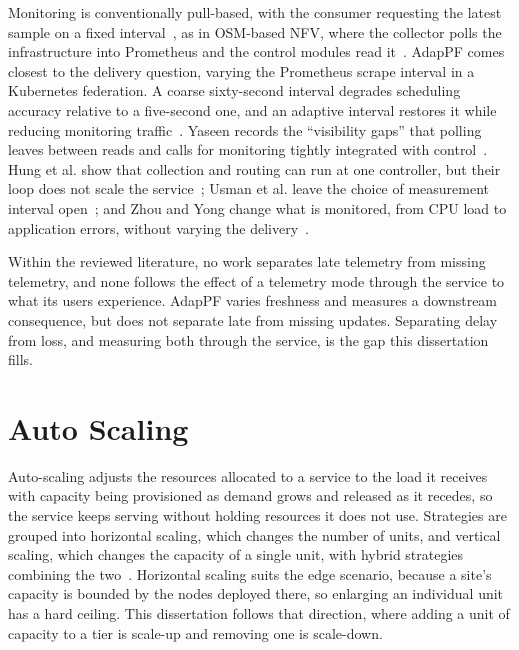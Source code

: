 ﻿\documentclass[12pt,reqno,twoside]{amsbook}
\begin{document}
Monitoring is conventionally pull-based, with the consumer requesting the latest
sample on a fixed interval~\parencite{Yaseen2025CountersTelemetrySurveyProgrammableNetwork},
as in OSM-based NFV, where the collector polls the infrastructure into Prometheus
and the control modules read
it~\parencite{Llorens2021SDNBasedHorizontalAutoScalingLoadBalancing}. AdapPF
comes closest to the delivery question, varying the Prometheus scrape interval in
a Kubernetes federation. A coarse sixty-second interval degrades scheduling
accuracy relative to a five-second one, and an adaptive interval restores it
while reducing monitoring
traffic~\parencite{Huang2023AdapPFSelfAdaptiveScrapeInterval}. Yaseen records the
\enquote{visibility gaps} that polling leaves between reads and calls for
monitoring tightly integrated with
control~\parencite{Yaseen2025CountersTelemetrySurveyProgrammableNetwork}. Hung et
al. show that collection and routing can run at one controller, but their loop
does not scale the service~\parencite{Hung2022SDNControllerMonitoringArchitecture5G};
Usman et al. leave the choice of measurement interval
open~\parencite{Usman2022SurveyObservabilityDistributedEdgeAmp}; and Zhou and Yong
change what is monitored, from CPU load to application errors, without varying
the delivery~\parencite{Zhou2024ImplementHPANginxServiceUsing}.

Within the reviewed literature, no work separates late telemetry from missing
telemetry, and none follows the effect of a telemetry mode through the service to
what its users experience. AdapPF varies freshness and measures a downstream
consequence, but does not separate late from missing updates. Separating delay
from loss, and measuring both through the service, is the gap this dissertation
fills.

\section{Auto Scaling}\label{sec:lit_auto_scaling} %
Auto-scaling adjusts the resources allocated to a service to the load it
receives with capacity being provisioned as demand grows and released as it recedes, so
the service keeps serving without holding resources it does not use. Strategies
are grouped into horizontal scaling, which changes the number of units,
and vertical scaling, which changes the capacity of a single unit, with hybrid
strategies combining the
two~\parencite{ElMrabet2025ComprehensiveSurveyTaxonomyAutoscalingTechniques}.
Horizontal scaling suits the edge scenario, because a site's capacity is bounded
by the nodes deployed there, so enlarging an individual unit has a hard ceiling.
This dissertation follows that direction, where adding a unit of capacity to a
tier is scale-up and removing one is scale-down.
\end{document}
